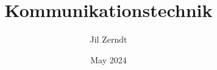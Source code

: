 \documentclass[a4paper, fontsize = 8pt, landscape]{scrartcl}
\title{Kommunikationstechnik}
\author{Jil Zerndt}
\date{May 2024}
\begin{document}
\begin{multicols*}{3}
    \thispagestyle{TitlePageStyle}
		\maketitle
    
    \raggedcolumns
    
    \raggedcolumns
    
    \raggedcolumns
    
    \raggedcolumns
    
    \raggedcolumns
    
    \raggedcolumns
    
    \raggedcolumns
    
    \raggedcolumns
    

\end{multicols*}
\end{document}

